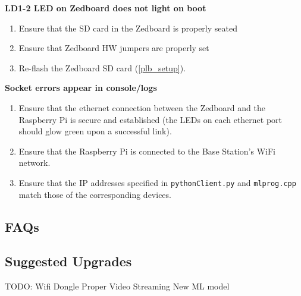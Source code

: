 \documentclass[10pt,letterpaper]{article}
\begin{document}
\textbf{LD1-2 LED on Zedboard does not light on boot}
\begin{enumerate}
\item Ensure that the SD card in the Zedboard is properly seated
\item Ensure that Zedboard HW jumpers are properly set
\item Re-flash the Zedboard SD card (\ref{plb_setup}).
\end{enumerate}

\textbf{Socket errors appear in console/logs}
\begin{enumerate}
\item Ensure that the ethernet connection between the Zedboard and the Raspberry Pi is secure and established (the LEDs on each ethernet port should glow green upon a successful link).
\item Ensure that the Raspberry Pi is connected to the Base Station's WiFi network.
\item Ensure that the IP addresses specified in \texttt{pythonClient.py} and \texttt{mlprog.cpp} match those of the corresponding devices.
\end{enumerate}

\subsection{FAQs}

\subsection{Suggested Upgrades}
TODO: 
Wifi Dongle
Proper Video Streaming
New ML model

\clearpage
{}



\end{document}
